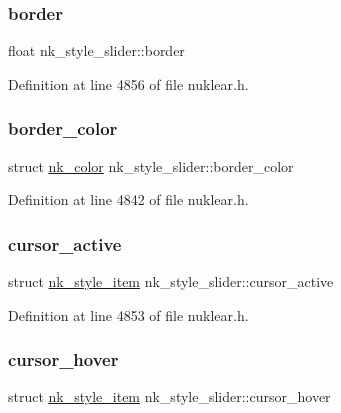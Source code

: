 \subsubsection{\texorpdfstring{border}{border}}
{\footnotesize\ttfamily float nk\+\_\+style\+\_\+slider\+::border}



Definition at line 4856 of file nuklear.\+h.

\mbox{\label{structnk__style__slider_a28182ddaeb0272101a4b484e8900c6db}} 
\subsubsection{\texorpdfstring{border\+\_\+color}{border\_color}}
{\footnotesize\ttfamily struct \mbox{\hyperlink{structnk__color}{nk\+\_\+color}} nk\+\_\+style\+\_\+slider\+::border\+\_\+color}



Definition at line 4842 of file nuklear.\+h.

\mbox{\label{structnk__style__slider_a110cadbf1de8a0830ea5da3e9d64563c}} 
\subsubsection{\texorpdfstring{cursor\+\_\+active}{cursor\_active}}
{\footnotesize\ttfamily struct \mbox{\hyperlink{structnk__style__item}{nk\+\_\+style\+\_\+item}} nk\+\_\+style\+\_\+slider\+::cursor\+\_\+active}



Definition at line 4853 of file nuklear.\+h.

\mbox{\label{structnk__style__slider_ae0045253c289dd775ba8fabf2b3b6761}} 
\subsubsection{\texorpdfstring{cursor\+\_\+hover}{cursor\_hover}}
{\footnotesize\ttfamily struct \mbox{\hyperlink{structnk__style__item}{nk\+\_\+style\+\_\+item}} nk\+\_\+style\+\_\+slider\+::cursor\+\_\+hover}



